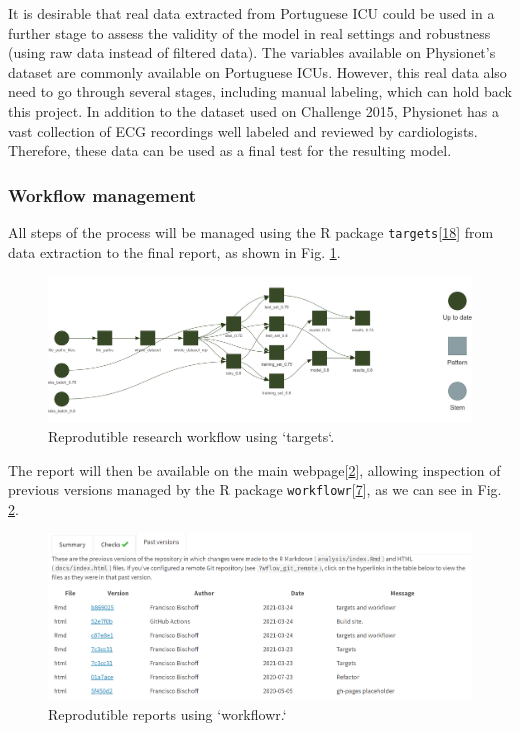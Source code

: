 \documentclass[runningheads]{llncs}
\begin{document}
It is desirable that real data extracted from Portuguese ICU could be
used in a further stage to assess the validity of the model in real
settings and robustness (using raw data instead of filtered data). The
variables available on Physionet's dataset are commonly available on
Portuguese ICUs. However, this real data also need to go through several
stages, including manual labeling, which can hold back this project. In
addition to the dataset used on Challenge 2015, Physionet has a vast
collection of ECG recordings well labeled and reviewed by cardiologists.
Therefore, these data can be used as a final test for the resulting
model.

\hypertarget{workflow-management}{%
\subsubsection{Workflow management}\label{workflow-management}}

All steps of the process will be managed using the R package
\texttt{targets}{[}\protect\hyperlink{ref-landau2021}{18}{]} from data
extraction to the final report, as shown in Fig. \ref{fig:targets}.

\begin{figure}
\includegraphics[width=1\linewidth]{targets} \caption{Reprodutible research workflow using `targets`.}\label{fig:targets}
\end{figure}

The report will then be available on the main
webpage{[}\protect\hyperlink{ref-franz_website}{2}{]}, allowing
inspection of previous versions managed by the R package
\texttt{workflowr}{[}\protect\hyperlink{ref-workflowr2021}{7}{]}, as we
can see in Fig. \ref{fig:workflow_workflowr}.

\begin{figure}
\includegraphics[width=1\linewidth]{workflowr} \caption{Reprodutible reports using `workflowr.`}\label{fig:workflow_workflowr}
\end{figure}
\end{document}
